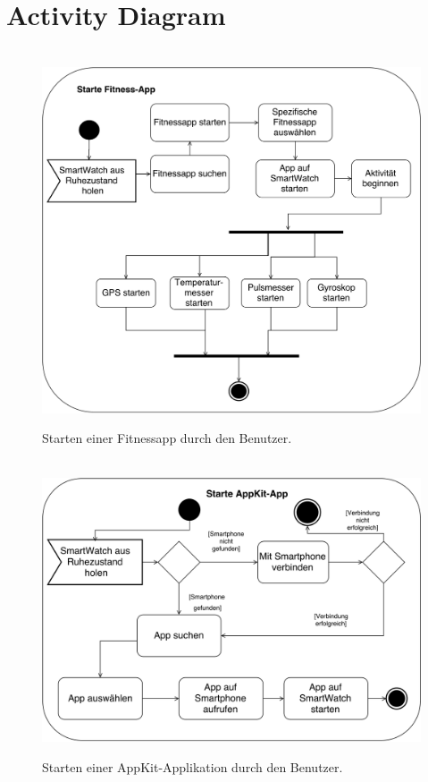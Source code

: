 \section{Activity Diagram}
\begin{figure}[h]
\centering\
\includegraphics[width=\textwidth]{img/activityFitness}
\caption{Starten einer Fitnessapp durch den Benutzer.}\label{fig:activityFitness}
\end{figure}

\begin{figure}[h]
\centering\
\includegraphics[width=\textwidth]{img/activityAppKit}
\caption{Starten einer AppKit-Applikation durch den Benutzer.}\label{fig:activityAppKit}
\end{figure}

